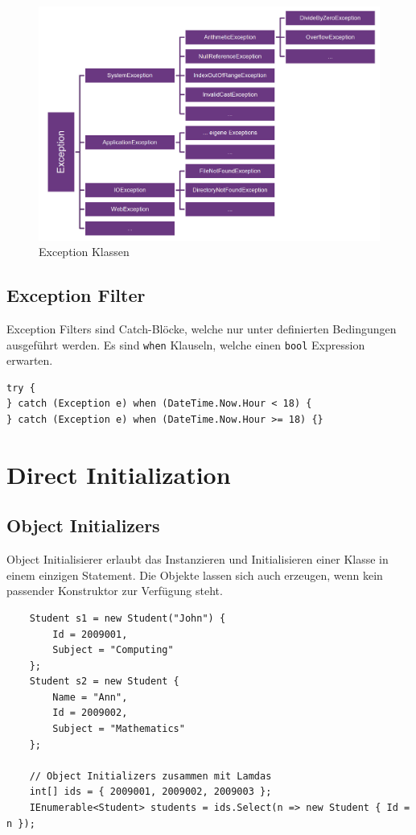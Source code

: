 \documentclass[
a4paper,
oneside,
10pt,
fleqn,
headsepline,
toc=listofnumbered, 
bibliography=totocnumbered]{scrartcl}
\let\stdsection\section
\renewcommand\section{\clearpage\stdsection}
\begin{document}
\begin{figure}[ht]
	\centering
	\includegraphics[width=\linewidth]{images/exception_classes}
	\caption{Exception Klassen}
	\label{fig:exceptionclasses}
\end{figure}

\subsection{Exception Filter}
Exception Filters sind Catch-Blöcke, welche nur unter definierten Bedingungen ausgeführt werden. Es sind \lstinline|when| Klauseln, welche einen \lstinline|bool| Expression erwarten.
\begin{lstlisting}
try {
} catch (Exception e) when (DateTime.Now.Hour < 18) {
} catch (Exception e) when (DateTime.Now.Hour >= 18) {}
\end{lstlisting}

\section{Direct Initialization}

\subsection{Object Initializers}
Object Initialisierer erlaubt das Instanzieren und Initialisieren einer Klasse in einem einzigen Statement. Die Objekte lassen sich auch erzeugen, wenn kein passender Konstruktor zur Verfügung steht.
\begin{lstlisting}
	Student s1 = new Student("John") {
		Id = 2009001,
		Subject = "Computing"
	};
	Student s2 = new Student {
		Name = "Ann",
		Id = 2009002,
		Subject = "Mathematics"
	};
	
	// Object Initializers zusammen mit Lamdas
	int[] ids = { 2009001, 2009002, 2009003 };
	IEnumerable<Student> students = ids.Select(n => new Student { Id = n });
\end{lstlisting}
\end{document}
